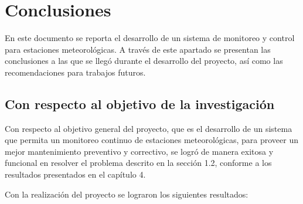 \chapter{Conclusiones}\label{conclusiones}

En este documento se reporta el desarrollo de un sistema de monitoreo y control para estaciones meteorológicas. A través de este apartado se presentan las conclusiones a las que se llegó durante el desarrollo del proyecto, así como las recomendaciones para trabajos futuros.


\section{Con respecto al objetivo de la investigación}



Con respecto al objetivo general del proyecto, que es el desarrollo de un sistema que permita un monitoreo continuo de estaciones meteorológicas, para proveer un mejor mantenimiento preventivo y correctivo, se logró de manera exitosa y funcional en resolver el problema descrito en la sección 1.2, conforme a los resultados presentados en el capítulo 4.


Con la realización del proyecto se lograron los siguientes resultados:


